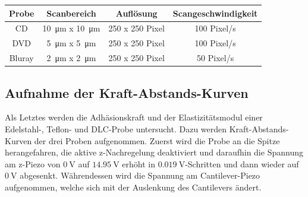     \begin{center}
      \label{tab:Scanparameter}
      \begin{tabular}{c c c c}
          \toprule
          Probe & Scanbereich & Auflösung & Scangeschwindigkeit \\
          \midrule
          CD      & \SI{10}{\micro\metre} x \SI{10}{\micro\metre} & 250 x 250 Pixel & 100 Pixel/s \\
          DVD     & \SI{5}{\micro\metre} x \SI{5}{\micro\metre}   & 250 x 250 Pixel & 100 Pixel/s \\
          Bluray  & \SI{2}{\micro\metre} x \SI{2}{\micro\metre}   & 250 x 250 Pixel & 50 Pixel/s \\

          \bottomrule
      \end{tabular}
  \end{center}
  \subsection{Aufnahme der Kraft-Abstands-Kurven}
    Als Letztes werden die Adhäsionskraft und der Elastizitätsmodul einer Edelstahl-, Teflon- und DLC-Probe untersucht. Dazu werden Kraft-Abstands-Kurven der drei Proben aufgenommen.
    Zuerst wird die Probe an die Spitze herangefahren, die aktive z-Nachregelung deaktiviert und daraufhin die Spannung am z-Piezo von $\SI{0}{\volt}$ auf $\SI{14.95}{\volt}$ erhöht in $\SI{0.019}{\volt}$-Schritten und dann wieder auf $\SI{0}{\volt}$ abgesenkt. Währendessen wird die Spannung am Cantilever-Piezo aufgenommen, welche sich mit der Auslenkung des Cantilevers ändert.